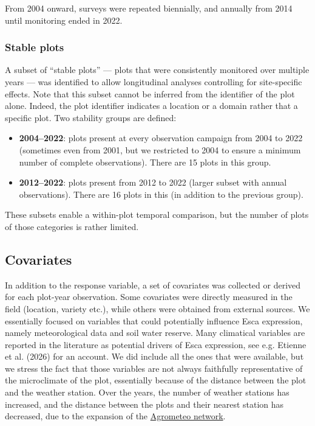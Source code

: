 From 2004 onward, surveys were repeated biennially, and annually from 2014 until monitoring ended in 2022.

\subsubsection{Stable plots}

A subset of ``stable plots'' --- plots that were consistently monitored over multiple years --- was identified to allow longitudinal analyses controlling for site-specific effects. Note that this subset cannot be inferred from the identifier of the plot alone. Indeed, the plot identifier indicates a location or a domain rather that a specific plot. Two stability groups are defined:

\begin{itemize}
\tightlist
\item
  \textbf{2004--2022}: plots present at every observation campaign from 2004 to 2022 (sometimes even from 2001, but we restricted to 2004 to ensure a minimum number of complete observations). There are 15 plots in this group.
\item
  \textbf{2012--2022}: plots present from 2012 to 2022 (larger subset with annual observations). There are 16 plots in this (in addition to the previous group).
\end{itemize}

These subsets enable a within-plot temporal comparison, but the number of plots of those categories is rather limited.

\subsection{Covariates}

In addition to the response variable, a set of covariates was collected or derived for each plot-year observation. Some covariates were directly measured in the field (location, variety etc.), while others were obtained from external sources. We essentially focused on variables that could potentially influence Esca expression, namely meteorological data and soil water reserve. Many climatical variables are reported in the literature as potential drivers of Esca expression, see e.g. Etienne et al. (2026) for an account. We did include all the ones that were available, but we stress the fact that those variables are not always faithfully representative of the microclimate of the plot, essentially because of the distance between the plot and the weather station. Over the years, the number of weather stations has increased, and the distance between the plots and their nearest station has decreased, due to the expansion of the \href{https://agrometeo.ch/}{Agrometeo network}.

